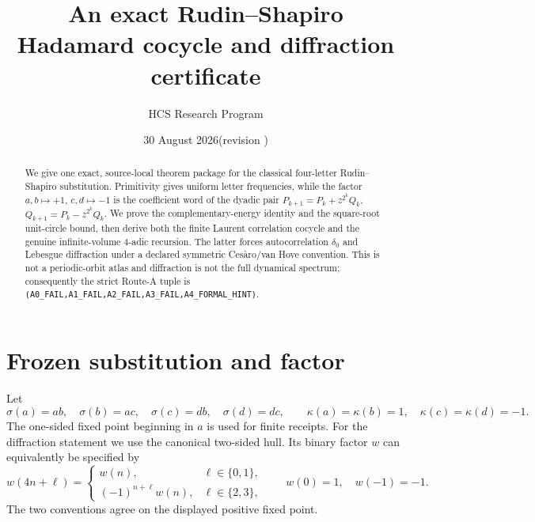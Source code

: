 \documentclass[10pt]{article}
\title{An exact Rudin--Shapiro Hadamard cocycle and diffraction certificate}
\author{HCS Research Program}
\date{30 August 2026\quad (revision \CRevisionRound)}
\begin{document}
\maketitle

\begin{abstract}
We give one exact, source-local theorem package for the classical four-letter
Rudin--Shapiro substitution.  Primitivity gives uniform letter frequencies,
while the factor $a,b\mapsto+1$, $c,d\mapsto-1$ is the coefficient word of
the dyadic pair $P_{k+1}=P_k+z^{2^k}Q_k$,
$Q_{k+1}=P_k-z^{2^k}Q_k$.  We prove the complementary-energy identity and
the square-root unit-circle bound, then derive both the finite Laurent
correlation cocycle and the genuine infinite-volume $4$-adic recursion.  The
latter forces autocorrelation $\delta_0$ and Lebesgue diffraction under a
declared symmetric Ces\`aro/van Hove convention.  This is not a periodic-orbit
atlas and diffraction is not the full dynamical spectrum; consequently the
strict Route-A tuple is
\texttt{(A0\_FAIL,A1\_FAIL,A2\_FAIL,A3\_FAIL,A4\_FORMAL\_HINT)}.
\end{abstract}

\section{Frozen substitution and factor}
Let
\[
 \sigma(a)=ab,\quad \sigma(b)=ac,\quad \sigma(c)=db,\quad
 \sigma(d)=dc,\qquad \kappa(a)=\kappa(b)=1,\quad
 \kappa(c)=\kappa(d)=-1 .
\]
The one-sided fixed point beginning in $a$ is used for finite receipts.  For
the diffraction statement we use the canonical two-sided hull.  Its binary
factor $w$ can equivalently be specified by
\[
 w(4n+\ell)=\begin{cases}w(n),&\ell\in\{0,1\},\\
 (-1)^{n+\ell}w(n),&\ell\in\{2,3\},\end{cases}\qquad
 w(0)=1,\quad w(-1)=-1 .                                      \tag{1}
\]
The two conventions agree on the displayed positive fixed point.
\end{document}
